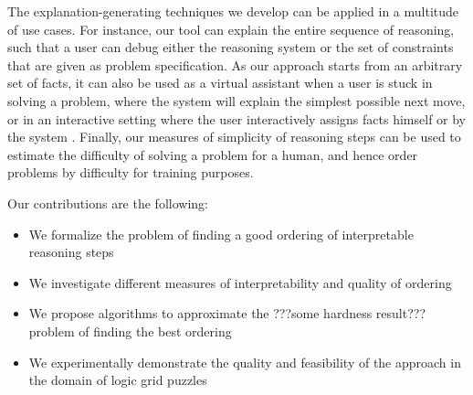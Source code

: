 The explanation-generating techniques we develop can be applied in a multitude of use cases. 
For instance, our tool can explain the entire sequence of reasoning, such that a user can debug either the reasoning system or the set of constraints that are given as problem specification. 
As our approach starts from an arbitrary set of facts, it can also be used as a virtual assistant when a user is stuck in solving a problem, where the system will explain the simplest possible next move, or in an interactive setting where the user interactively assigns facts himself or by the system . 
Finally, our measures of simplicity of reasoning steps can be used to estimate the difficulty of solving a problem for a human, and hence order problems by difficulty for training purposes.


Our contributions are the following:
\begin{itemize}
	\item We formalize the problem of finding a good ordering of interpretable reasoning steps
	\item We investigate different measures of interpretability and quality of ordering
	\item We propose algorithms to approximate the ???some hardness result??? problem of finding the best ordering  
	\item We experimentally demonstrate the quality and feasibility of the approach in the domain of logic grid puzzles
\end{itemize}


 

